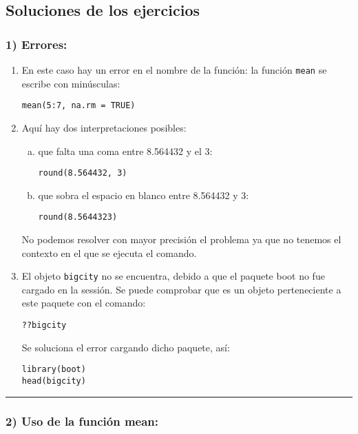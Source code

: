 \documentclass[]{article}
\begin{document}
\subsection{Soluciones de los ejercicios}

\subsubsection{1) Errores:}

\begin{enumerate}[1.]
\item
  En este caso hay un error en el nombre de la función: la función
  \texttt{mean} se escribe con minúsculas:

\begin{verbatim}
mean(5:7, na.rm = TRUE)
\end{verbatim}
\item
  Aquí hay dos interpretaciones posibles:
  \begin{enumerate}[a.]
  \item
    que falta una coma entre 8.564432 y el 3:

\begin{verbatim}
round(8.564432, 3)
\end{verbatim}
  \item
    que sobra el espacio en blanco entre 8.564432 y 3:

\begin{verbatim}
round(8.5644323)
\end{verbatim}
  \end{enumerate}
  No podemos resolver con mayor precisión el problema ya que no tenemos
  el contexto en el que se ejecuta el comando.
\item
  El objeto \texttt{bigcity} no se encuentra, debido a que el paquete
  boot no fue cargado en la sessión. Se puede comprobar que es un objeto
  perteneciente a este paquete con el comando:

\begin{verbatim}
??bigcity
\end{verbatim}
  Se soluciona el error cargando dicho paquete, así:

\begin{verbatim}
library(boot)
head(bigcity)
\end{verbatim}
\end{enumerate}
\begin{center}\rule{3in}{0.4pt}\end{center}

\subsubsection{2) Uso de la función mean:}
\end{document}
